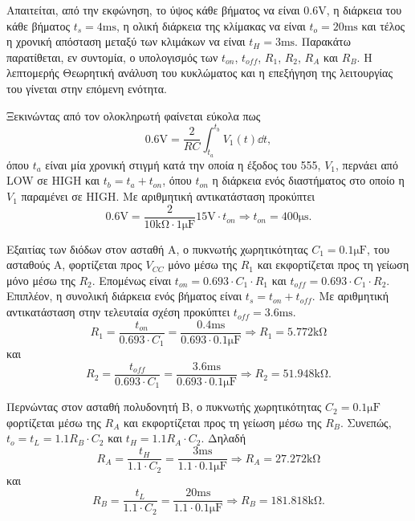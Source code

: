 Απαιτείται, από την εκφώνηση, το ύψος κάθε βήματος να είναι $0.6\unit{\volt}$, η διάρκεια του κάθε βήματος $t_s=4\unit{\ms}$, η ολική διάρκεια της κλίμακας να είναι $t_o=20\unit{\ms}$ και τέλος η χρονική απόσταση μεταξύ των κλιμάκων να είναι $t_H=3\unit{\ms}$. Παρακάτω παρατίθεται, εν συντομία, ο υπολογισμός των $t_{on}$, $t_{off}$, $R_1$, $R_2$, $R_A$ και $R_B$. Η λεπτομερής Θεωρητική ανάλυση του κυκλώματος και η επεξήγηση της λειτουργίας του γίνεται στην επόμενη ενότητα.\par
Ξεκινώντας από τον ολοκληρωτή φαίνεται εύκολα πως
\begin{equation*}
	0.6\unit{\volt}=\frac{2}{RC}\int_{t_a}^{t_b}{V_1(t)\dd{t}},
\end{equation*}
όπου $t_a$ είναι μία χρονική στιγμή κατά την οποία η έξοδος του 555, $V_1$, περνάει από LOW σε HIGH και $t_b=t_a+t_{on}$, όπου $t_{on}$ η διάρκεια ενός διαστήματος στο οποίο η $V_1$ παραμένει σε HIGH. Με αριθμητική αντικατάσταση προκύπτει
\begin{equation*}
	0.6\unit{\volt}=\frac{2}{10\unit{\kilo\ohm}\cdot 1\unit{\micro\farad}}15\unit{\volt}\cdot t_{on}\Rightarrow t_{on}=400\unit{\micro\second}.
\end{equation*}

Εξαιτίας των διόδων στον ασταθή Α, ο πυκνωτής χωρητικότητας $C_1=0.1\unit{\micro\farad}$, του ασταθούς  Α, φορτίζεται προς $V_{CC}$ μόνο μέσω της $R_1$ και εκφορτίζεται προς τη γείωση μόνο μέσω της $R_2$. Επομένως είναι $t_{on}=0.693\cdot C_1\cdot R_1$ και $t_{off}=0.693\cdot C_1\cdot R_2$. Επιπλέον, η συνολική διάρκεια ενός βήματος είναι $t_s=t_{on}+t_{off}$. Με αριθμητική αντικατάσταση στην τελευταία σχέση προκύπτει $t_{off}=3.6\unit{\ms}$.
\begin{equation*}
	R_1=\frac{t_{on}}{0.693\cdot C_1}=\frac{0.4\unit{\ms}}{0.693\cdot 0.1\unit{\micro\farad}}\Rightarrow R_1=5.772\unit{\kilo\ohm}
\end{equation*}
και
\begin{equation*}
	R_2=\frac{t_{off}}{0.693\cdot C_1}=\frac{3.6\unit{\ms}}{0.693\cdot 0.1\unit{\micro\farad}}\Rightarrow R_2=51.948\unit{\kilo\ohm}.
\end{equation*}

Περνώντας στον ασταθή πολυδονητή Β, ο πυκνωτής χωρητικότητας $C_2=0.1\unit{\micro\farad}$ φορτίζεται μέσω της $R_A$ και εκφορτίζεται προς τη γείωση μέσω της $R_B$. Συνεπώς, $t_o=t_L=1.1R_B\cdot C_2$ και $t_H=1.1R_A\cdot C_2$. Δηλαδή
\begin{equation*}
	R_Α=\frac{t_{H}}{1.1\cdot C_2}=\frac{3\unit{\ms}}{1.1\cdot 0.1\unit{\micro\farad}}\Rightarrow R_A=27.272\unit{\kilo\ohm}
\end{equation*}
και
\begin{equation*}
	R_B=\frac{t_{L}}{1.1\cdot C_2}=\frac{20\unit{\ms}}{1.1\cdot 0.1\unit{\micro\farad}}\Rightarrow R_B=181.818\unit{\kilo\ohm}.
\end{equation*}